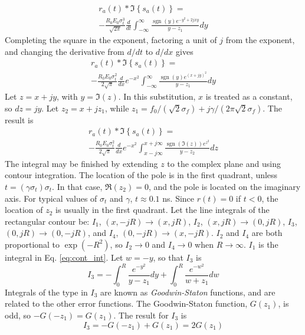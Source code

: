 \documentclass[amsmath,amssymb,aps,prd,10pt,twocolumn,showkeys]{revtex4}
\DeclareMathOperator{\sgn}{sgn}
\begin{document}
\begin{itemize}
\begin{multline}
r_a(t) * \Im\left\lbrace s_a(t) \right\rbrace = \\
-\frac{R_0E_0\sigma_t^3}{\sqrt{2\pi}}\frac{d}{dt}\int_{-\infty}^{\infty} \frac{\sgn(y) e^{-y^2+2jxy}}{y-z_1} dy
\end{multline}
Completing the square in the exponent, factoring a unit of $j$ from the exponent, and changing the derivative from $d/dt$ to $d/dx$ gives
\begin{multline}
r_a(t) * \Im\left\lbrace s_a(t) \right\rbrace = \\
-\frac{R_0E_0\sigma_t^2}{2\sqrt{\pi}}\frac{d}{dx}e^{-x^2} \int_{-\infty}^{\infty} \frac{\sgn(y) e^{(x+jy)^2}}{y-z_1}dy
\end{multline}
Let $z = x+jy$, with $y = \Im(z)$.  In this substitution, $x$ is treated as a constant, so $dz = jy$.  Let $z_2 = x+j z_1$, while $z_1 = f_0/(\sqrt{2}\sigma_f) + j\gamma/(2\pi \sqrt{2} \sigma_f)$.  The result is
\begin{multline}
r_a(t) * \Im\left\lbrace s_a(t) \right\rbrace = \\
-\frac{R_0E_0\sigma_t^2}{2\sqrt{\pi}}\frac{d}{dx}e^{-x^2} \int_{x-j\infty}^{x+j\infty} \frac{\sgn(\Im(z)) e^{z^2}}{y-z_2}dz \label{eq:cont_int}
\end{multline}
The integral may be finished by extending $z$ to the complex plane and using contour integration.  The location of the pole is in the first quadrant, unless $t = (\gamma \sigma_t)\sigma_t$.  In that case, $\Re(z_2)=0$, and the pole is located on the imaginary axis.  For typical values of $\sigma_t$ and $\gamma$, $t\approx 0.1$ ns. Since $r(t)=0$ if $t<0$, the location of $z_2$ is usually in the first quadrant.  Let the line integrals of the rectangular contour be: $I_1$, $(x,-jR) \to (x,jR)$, $I_2$, $(x,jR) \to (0,jR)$, $I_3$, $(0,jR) \to (0,-jR)$, and $I_4$, $(0,-jR) \to (x,-jR)$.  $I_2$ and $I_4$ are both proportional to $\exp(-R^2)$, so $I_2 \to 0$ and $I_4 \to 0$ when $R \to \infty$.  $I_1$ is the integral in Eq. \ref{eq:cont_int}.  Let $w = -y$, so that $I_3$ is
\begin{equation}
I_3 = -\int_0^{R} \frac{e^{-y^2}}{y-z_1} dy + \int_0^{R} \frac{e^{-w^2}}{w+z_1} dw
\end{equation}
Integrals of the type in $I_3$ are known as \textit{Goodwin-Staton} functions, and are related to the other error functions.  The Goodwin-Staton function, $G(z_1)$, is odd, so $-G(-z_1) = G(z_1)$.  The result for $I_3$ is
\begin{equation}
I_3 = -G(-z_1) + G(z_1) = 2G(z_1)

\end{equation}
\end{itemize}
\end{document}
